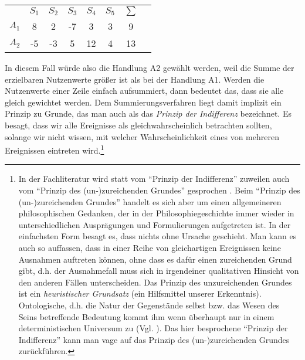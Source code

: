 \begin{center}
\begin{tabular}{c|c|c|c|c|c|cc}
\multicolumn{1}{c}{ } & \multicolumn{1}{c}{$S_1$} &
\multicolumn{1}{c}{$S_2$} & \multicolumn{1}{c}{$S_3$} & 
\multicolumn{1}{c}{$S_4$} & 
\multicolumn{1}{c}{$S_5$} & \multicolumn{1}{c}{ $\sum$ } \\ \cline{2-6}
$A_1$ & 8  & 2  & -7 & 3  & 3 &  9 \\ \cline{2-6}
$A_2$ & -5 & -3 & 5  & 12 & 4 & 13  \\ \cline{2-6}
\end{tabular}
\end{center}

In diesem Fall würde also die Handlung A2 gewählt werden, weil die Summe der
erzielbaren Nutzenwerte größer ist als bei der Handlung A1. Werden die
Nutzenwerte einer Zeile einfach aufsummiert, dann bedeutet das, dass sie alle
gleich gewichtet werden. Dem Summierungsverfahren liegt damit implizit ein
Prinzip zu Grunde, das man auch als das {\em Prinzip der Indifferenz} bezeichnet.
 Es besagt, dass wir alle Ereignisse als
gleichwahrscheinlich betrachten sollten, solange wir nicht wissen, mit welcher
Wahrscheinlichkeit eines von mehreren Ereignissen eintreten wird.\footnote{In
der Fachliteratur wird statt vom "`Prinzip der Indifferenz"' zuweilen auch vom
"`Prinzip des (un-)zureichenden Grundes"' gesprochen \cite[S. 35ff]{resnik:1987}.
Beim "`Prinzip des (un-)zureichenden Grundes"' handelt es sich aber um einen
allgemeineren philosophischen Gedanken, der in der Philosophiegeschichte immer
wieder in unterschiedlichen Ausprägungen und Formulierungen aufgetreten ist. In
der einfachsten Form besagt es, dass nichts ohne Ursache geschieht. Man kann es
auch so auffassen, dass in einer Reihe von gleichartigen Ereignissen keine
Ausnahmen auftreten können, ohne dass es dafür einen zureichenden Grund gibt,
d.h. der Ausnahmefall muss sich in irgendeiner qualitativen Hinsicht von den
anderen Fällen unterscheiden. Das Prinzip des unzureichenden Grundes ist ein {\em
heuristischer Grundsatz} (ein Hilfsmittel unserer Erkenntnis). Ontologische, d.h.
die Natur der Gegenstände selbst bzw. das Wesen des Seins betreffende Bedeutung
kommt ihm wenn überhaupt nur in einem deterministischen Universum zu (Vgl.
\cite[S. 130]{schurz:2006}). Das hier besprochene "`Prinzip der Indifferenz"'
kann man vage auf das Prinzip des (un-)zureichenden Grundes zurückführen.}


